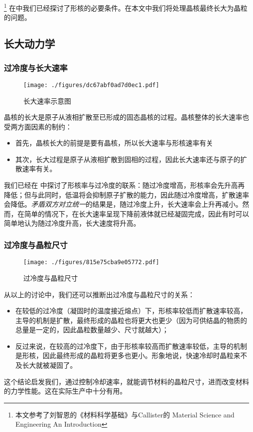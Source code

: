 
\footnote{本文参考了刘智恩的《材料科学基础》与Callister的 Material Science and Engineering An Introduction} 在中我们已经探讨了形核的必要条件。在本文中我们将处理晶核最终长大为晶粒的问题。

\subsection{长大动力学}
\subsubsection{过冷度与长大速率}
\begin{figure}[ht]
\centering
\texttt{[image: ./figures/dc67abf0ad7d0ec1.pdf]}
\caption{长大速率示意图} \label{fig_GGRW_1}
\end{figure}

晶核的长大是原子从液相扩散至已形成的固态晶核的过程。晶核整体的长大速率也受两方面因素的制约：
\begin{itemize}
\item 首先，晶核长大的前提是要有晶核，所以长大速率与形核速率有关
\item 其次，长大过程是原子从液相扩散到固相的过程，因此长大速率还与原子的扩散速率有关。
\end{itemize}

我们已经在 中探讨了形核率与过冷度的联系：随过冷度增高，形核率会先升高再降低；但与此同时，低温将会抑制原子扩散的能力，因此随过冷度增高，扩散速率会降低。\textsl{矛盾双方对立统一}的结果是，随过冷度上升，长大速率会上升再减小。然而，在简单的情况下，在长大速率呈现下降前液体就已经凝固完成，因此有时可以简单地认为随过冷度升高，长大速度将升高。

\subsubsection{过冷度与晶粒尺寸}
\begin{figure}[ht]
\centering
\texttt{[image: ./figures/815e75cba9e05772.pdf]}
\caption{过冷度与晶粒尺寸} \label{fig_GGRW_2}
\end{figure}
从以上的讨论中，我们还可以推断出过冷度与晶粒尺寸的关系：
\begin{itemize}
\item 在较低的过冷度（凝固时的温度接近熔点）下，形核率较低而扩散速率较高，主导的机制是扩散，最终形成的晶粒也将更大也更少（因为可供结晶的物质的总量是一定的，因此晶粒数量越少、尺寸就越大）；
\item 反过来说，在较高的过冷度下，由于形核率较高而扩散速率较低，主导的机制是形核，因此最终形成的晶粒将更多也更小。形象地说，快速冷却时晶粒来不及长大就被凝固了。
\end{itemize}
这个结论启发我们，通过控制冷却速率，就能调节材料的晶粒尺寸，进而改变材料的力学性能。这在实际生产中十分有用。


